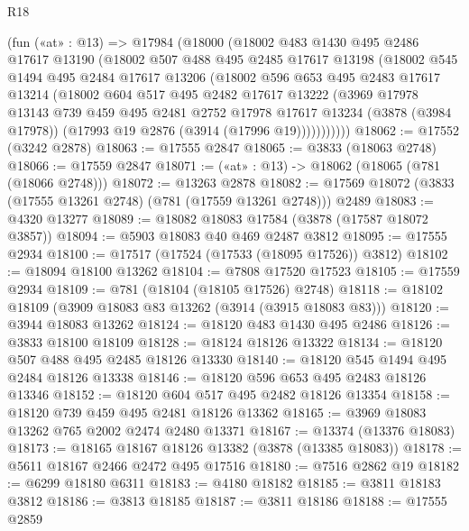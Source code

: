 \begin{lexlean}{R18}
\begin{coremodule}
    (fun («at» : @13) =>
    @17984
      (@18000
        (@18002
          @483
          @1430
          @495
          @2486
          @17617
          @13190
          (@18002
            @507
            @488
            @495
            @2485
            @17617
            @13198
            (@18002
              @545
              @1494
              @495
              @2484
              @17617
              @13206
              (@18002
                @596
                @653
                @495
                @2483
                @17617
                @13214
                (@18002
                  @604
                  @517
                  @495
                  @2482
                  @17617
                  @13222
                  (@3969
                    @17978
                    @13143
                    @739
                    @459
                    @495
                    @2481
                    @2752
                    @17978
                    @17617
                    @13234
                    (@3878 (@3984 @17978))
                    (@17993 @19 @2876 (@3914 (@17996 @19)))))))))))
@18062 := @17552 (@3242 @2878)
@18063 := @17555 @2847
@18065 := @3833 (@18063 @2748)
@18066 := @17559 @2847
@18071 := («at» : @13) -> @18062 (@18065 (@781 (@18066 @2748)))
@18072 := @13263 @2878
@18082 := @17569 @18072 (@3833 (@17555 @13261 @2748) (@781 (@17559 @13261 @2748))) @2489
@18083 := @4320 @13277
@18089 := @18082 @18083 @17584 (@3878 (@17587 @18072 @3857))
@18094 := @5903 @18083 @40 @469 @2487 @3812
@18095 := @17555 @2934
@18100 := @17517 (@17524 (@17533 (@18095 @17526)) @3812)
@18102 := @18094 @18100 @13262
@18104 := @7808 @17520 @17523
@18105 := @17559 @2934
@18109 := @781 (@18104 (@18105 @17526) @2748)
@18118 := @18102 @18109 (@3909 @18083 @83 @13262 (@3914 (@3915 @18083 @83)))
@18120 := @3944 @18083 @13262
@18124 := @18120 @483 @1430 @495 @2486
@18126 := @3833 @18100 @18109
@18128 := @18124 @18126 @13322
@18134 := @18120 @507 @488 @495 @2485 @18126 @13330
@18140 := @18120 @545 @1494 @495 @2484 @18126 @13338
@18146 := @18120 @596 @653 @495 @2483 @18126 @13346
@18152 := @18120 @604 @517 @495 @2482 @18126 @13354
@18158 := @18120 @739 @459 @495 @2481 @18126 @13362
@18165 := @3969 @18083 @13262 @765 @2002 @2474 @2480 @13371
@18167 := @13374 (@13376 @18083)
@18173 := @18165 @18167 @18126 @13382 (@3878 (@13385 @18083))
@18178 := @5611 @18167 @2466 @2472 @495 @17516
@18180 := @7516 @2862 @19
@18182 := @6299 @18180 @6311
@18183 := @4180 @18182
@18185 := @3811 @18183 @3812
@18186 := @3813 @18185
@18187 := @3811 @18186
@18188 := @17555 @2859

\end{coremodule}
\end{lexlean}
